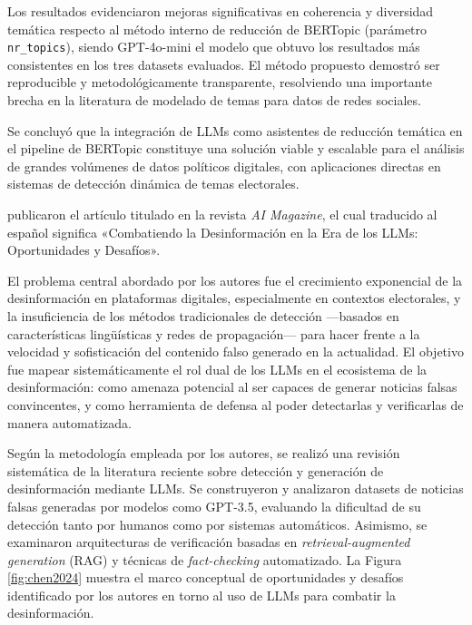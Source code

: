 Los resultados evidenciaron mejoras significativas en coherencia y diversidad temática respecto al método interno de reducción de BERTopic (parámetro \texttt{nr\_topics}), siendo GPT-4o-mini el modelo que obtuvo los resultados más consistentes en los tres datasets evaluados. El método propuesto demostró ser reproducible y metodológicamente transparente, resolviendo una importante brecha en la literatura de modelado de temas para datos de redes sociales.
 
Se concluyó que la integración de LLMs como asistentes de reducción temática en el pipeline de BERTopic constituye una solución viable y escalable para el análisis de grandes volúmenes de datos políticos digitales, con aplicaciones directas en sistemas de detección dinámica de temas electorales.
 
\cite{pr_chen2024combating_misinformation} publicaron el artículo titulado  en la revista \textit{AI Magazine}, el cual traducido al español significa «Combatiendo la Desinformación en la Era de los LLMs: Oportunidades y Desafíos».
 
El problema central abordado por los autores fue el crecimiento exponencial de la desinformación en plataformas digitales, especialmente en contextos electorales, y la insuficiencia de los métodos tradicionales de detección —basados en características lingüísticas y redes de propagación— para hacer frente a la velocidad y sofisticación del contenido falso generado en la actualidad. El objetivo fue mapear sistemáticamente el rol dual de los LLMs en el ecosistema de la desinformación: como amenaza potencial al ser capaces de generar noticias falsas convincentes, y como herramienta de defensa al poder detectarlas y verificarlas de manera automatizada.
 
Según la metodología empleada por los autores, se realizó una revisión sistemática de la literatura reciente sobre detección y generación de desinformación mediante LLMs. Se construyeron y analizaron datasets de noticias falsas generadas por modelos como GPT-3.5, evaluando la dificultad de su detección tanto por humanos como por sistemas automáticos. Asimismo, se examinaron arquitecturas de verificación basadas en \textit{retrieval-augmented generation} (RAG) y técnicas de \textit{fact-checking} automatizado. La Figura \ref{fig:chen2024} muestra el marco conceptual de oportunidades y desafíos identificado por los autores en torno al uso de LLMs para combatir la desinformación.
 

